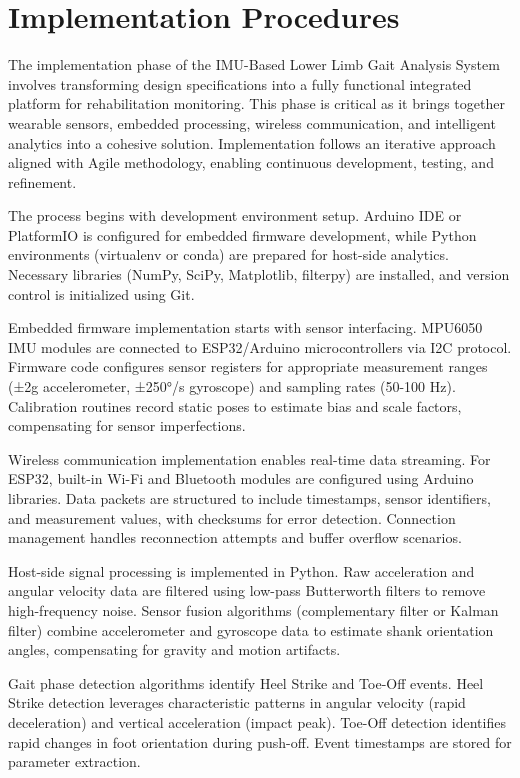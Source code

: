 \documentclass[12pt,a4paper]{report}
\begin{document}
\clearpage
{}
\setcounter{section}{0}

\section{Implementation Procedures}

The implementation phase of the IMU-Based Lower Limb Gait Analysis System involves transforming design specifications into a fully functional integrated platform for rehabilitation monitoring. This phase is critical as it brings together wearable sensors, embedded processing, wireless communication, and intelligent analytics into a cohesive solution. Implementation follows an iterative approach aligned with Agile methodology, enabling continuous development, testing, and refinement.

The process begins with development environment setup. Arduino IDE or PlatformIO is configured for embedded firmware development, while Python environments (virtualenv or conda) are prepared for host-side analytics. Necessary libraries (NumPy, SciPy, Matplotlib, filterpy) are installed, and version control is initialized using Git.

Embedded firmware implementation starts with sensor interfacing. MPU6050 IMU modules are connected to ESP32/Arduino microcontrollers via I2C protocol. Firmware code configures sensor registers for appropriate measurement ranges (±2g accelerometer, ±250°/s gyroscope) and sampling rates (50-100 Hz). Calibration routines record static poses to estimate bias and scale factors, compensating for sensor imperfections.

Wireless communication implementation enables real-time data streaming. For ESP32, built-in Wi-Fi and Bluetooth modules are configured using Arduino libraries. Data packets are structured to include timestamps, sensor identifiers, and measurement values, with checksums for error detection. Connection management handles reconnection attempts and buffer overflow scenarios.

Host-side signal processing is implemented in Python. Raw acceleration and angular velocity data are filtered using low-pass Butterworth filters to remove high-frequency noise. Sensor fusion algorithms (complementary filter or Kalman filter) combine accelerometer and gyroscope data to estimate shank orientation angles, compensating for gravity and motion artifacts.

Gait phase detection algorithms identify Heel Strike and Toe-Off events. Heel Strike detection leverages characteristic patterns in angular velocity (rapid deceleration) and vertical acceleration (impact peak). Toe-Off detection identifies rapid changes in foot orientation during push-off. Event timestamps are stored for parameter extraction.
\end{document}

